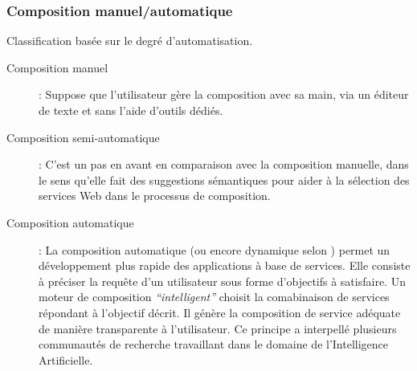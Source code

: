 \begin{description}
      \end{description}            

      \subsubsection{Composition manuel/automatique}
      \label{sec:comp-manu}
      Classification basée sur le degré d'automatisation.

      \renewcommand{\descriptionlabel}[1]{\hspace{1cm}\textbullet~\textsf{#1}}
      \begin{description}
      \item[Composition manuel]: Suppose que l'utilisateur gère la
        composition avec sa main, via un éditeur de texte et sans
        l'aide d'outils dédiés.

      \item[Composition semi-automatique]: C'est un pas en avant en
        comparaison avec la composition manuelle, dans le sens qu'elle
        fait des suggestions sémantiques pour aider à la sélection des
        services Web dans le processus de composition.

      \item[Composition automatique]: La composition automatique (ou
        encore dynamique selon \cite{fluegge2006challenges}) permet un
        développement plus rapide des applications à base de
        services. Elle consiste à préciser la requête d'un utilisateur
        sous forme d'objectifs à satisfaire. Un moteur de composition
        \textit{``intelligent''} choisit la comabinaison de services
        répondant à l'objectif décrit. Il génère la composition de
        service adéquate de manière transparente à l'utilisateur. Ce
        principe a interpellé plusieurs communautés de recherche
        travaillant dans le domaine de l'Intelligence Artificielle.
        \cite{elie2010}
      \end{description}

